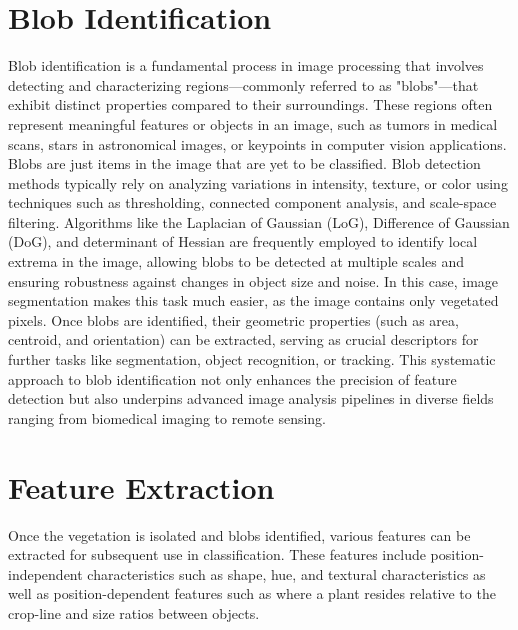 \documentclass[letterpaper, notitlepage]{report}
\begin{document}
{\section{Blob Identification}
Blob identification is a fundamental process in image processing that involves detecting and characterizing regions—commonly referred to as "blobs"—that exhibit distinct properties compared to their surroundings. These regions often represent meaningful features or objects in an image, such as tumors in medical scans, stars in astronomical images, or keypoints in computer vision applications. Blobs are just items in the image that are yet to be classified.  Blob detection methods typically rely on analyzing variations in intensity, texture, or color using techniques such as thresholding, connected component analysis, and scale-space filtering. Algorithms like the Laplacian of Gaussian (LoG), Difference of Gaussian (DoG), and determinant of Hessian are frequently employed to identify local extrema in the image, allowing blobs to be detected at multiple scales and ensuring robustness against changes in object size and noise. In this case, image segmentation makes this task much easier, as the image contains only vegetated pixels. Once blobs are identified, their geometric properties (such as area, centroid, and orientation) can be extracted, serving as crucial descriptors for further tasks like segmentation, object recognition, or tracking. This systematic approach to blob identification not only enhances the precision of feature detection but also underpins advanced image analysis pipelines in diverse fields ranging from biomedical imaging to remote sensing.

\section{Feature Extraction}
Once the vegetation is isolated and blobs identified, various features can be extracted for subsequent use in classification. These features include position-independent characteristics such as shape, hue, and textural characteristics as well as position-dependent features such as where a plant resides relative to the crop-line and size ratios between objects.  

}
\end{document}

